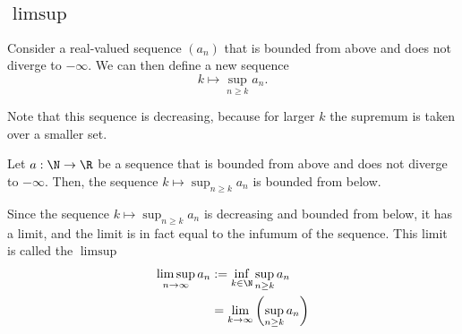 \subsection{$\limsup$}
Consider a real-valued sequence $(a_n)$ that is bounded from above and does not diverge to $-\infty$. We can then define a new sequence
$$k \mapsto \sup_{n \ge k} a_n.$$

Note that this sequence is decreasing, because for larger $k$ the supremum is taken over a smaller set. 
\begin{lemma}
    Let $a: \N \to \R$ be a sequence that is bounded from above and does not diverge to $-\infty$. Then, the sequence $k \mapsto \sup_{n \ge k}a_n$ is bounded
    from below.
\end{lemma}

Since the sequence $k \mapsto \sup_{n \ge k}a_n$ is decreasing and bounded from below, it has a limit, and the limit is in fact equal to the infumum of the sequence. This limit is called the $\limsup$
\begin{align*}
    \limsup_{n\to\infty}a_n &:= \inf_{k\in\N}\sup_{n \ge k}a_n \\
                            &=\lim_{k\to\infty}\left(\sup_{n\ge k}a_n\right)
\end{align*}


